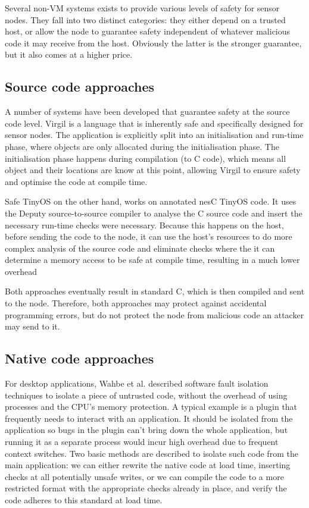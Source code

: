 Several non-VM systems exists to provide various levels of safety for sensor nodes. They fall into two distinct categories: they either depend on a trusted host, or allow the node to guarantee safety independent of whatever malicious code it may receive from the host. Obviously the latter is the stronger guarantee, but it also comes at a higher price.

\subsection{Source code approaches}
A number of systems have been developed that guarantee safety at the source code level. Virgil \cite{Titzer:2006uy} is a language that is inherently safe and specifically designed for sensor nodes. The application is explicitly split into an initialisation and run-time phase, where objects are only allocated during the initialisation phase. The initialisation phase happens during compilation (to C code), which means all object and their locations are know at this point, allowing Virgil to ensure safety and optimise the code at compile time.

Safe TinyOS on the other hand, works on annotated nesC TinyOS code. It uses the Deputy \cite{Condit:2007uo} source-to-source compiler to analyse the C source code and insert the necessary run-time checks were necessary. Because this happens on the host, before sending the code to the node, it can use the host's resources to do more complex analysis of the source code and eliminate checks where the it can determine a memory access to be safe at compile time, resulting in a much lower overhead

Both approaches eventually result in standard C, which is then compiled and sent to the node. Therefore, both approaches may protect against accidental programming errors, but do not protect the node from malicious code an attacker may send to it.

\subsection{Native code approaches}
For desktop applications, Wahbe et al. described software fault isolation \cite{Wahbe:1994cj} techniques to isolate a piece of untrusted code, without the overhead of using processes and the CPU's memory protection. A typical example is a plugin that frequently needs to interact with an application. It should be isolated from the application so bugs in the plugin can't bring down the whole application, but running it as a separate process would incur high overhead due to frequent context switches. Two basic methods are described to isolate such code from the main application: we can either rewrite the native code at load time, inserting checks at all potentially unsafe writes, or we can compile the code to a more restricted format with the appropriate checks already in place, and verify the code adheres to this standard at load time.


